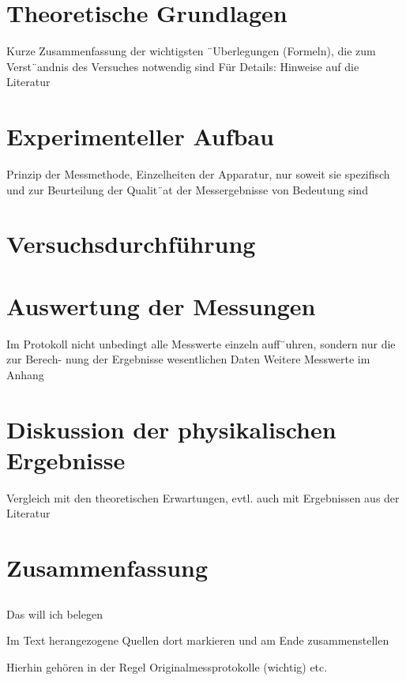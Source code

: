 \documentclass[10pt,a4paper]{article}
\begin{document}
\section{Theoretische Grundlagen}

Kurze Zusammenfassung der wichtigsten ¨Uberlegungen (Formeln), die zum Verst¨andnis des
Versuches notwendig sind
Für Details: Hinweise auf die Literatur

\section{Experimenteller Aufbau}

Prinzip der Messmethode, Einzelheiten der Apparatur, nur soweit sie speziﬁsch und zur
Beurteilung der Qualit¨at der Messergebnisse von Bedeutung sind

\section{Versuchsdurchführung}
\section{Auswertung der Messungen}

Im Protokoll nicht unbedingt alle Messwerte einzeln auﬀ¨uhren, sondern nur die zur Berech-
nung der Ergebnisse wesentlichen Daten
Weitere Messwerte im Anhang

\section{Diskussion der physikalischen Ergebnisse}
Vergleich mit den theoretischen Erwartungen, evtl. auch mit Ergebnissen aus der Literatur


\section{Zusammenfassung}
\subsection{}  Das will ich belegen \cite[p. 2]{erstesBuch}



\newpage




Im Text herangezogene Quellen dort markieren und am Ende zusammenstellen


\newpage

\listoffigures %
Hierhin gehören in der Regel Originalmessprotokolle (wichtig) etc. 

\end{document}
